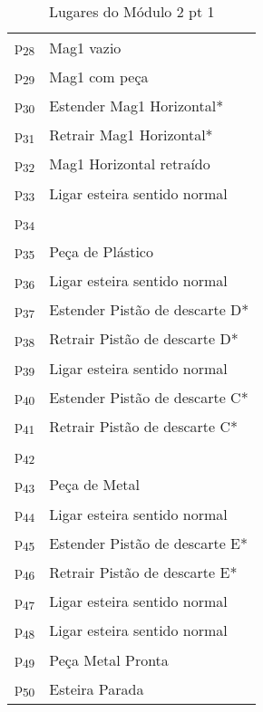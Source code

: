\begin{table}[htbp]
\caption{Lugares do Módulo 2 pt 1}
\centering
\begin{tabular}{ll}
p\textsubscript{28} & Mag1 vazio\\
p\textsubscript{29} & Mag1 com peça\\
p\textsubscript{30} & Estender Mag1 Horizontal*\\
p\textsubscript{31} & Retrair Mag1 Horizontal*\\
p\textsubscript{32} & Mag1 Horizontal retraído\\
p\textsubscript{33} & Ligar esteira sentido normal\\
p\textsubscript{34} & \\
p\textsubscript{35} & Peça de Plástico\\
p\textsubscript{36} & Ligar esteira sentido normal\\
p\textsubscript{37} & Estender Pistão de descarte D*\\
p\textsubscript{38} & Retrair Pistão de descarte D*\\
p\textsubscript{39} & Ligar esteira sentido normal\\
p\textsubscript{40} & Estender Pistão de descarte C*\\
p\textsubscript{41} & Retrair Pistão de descarte C*\\
p\textsubscript{42} & \\
p\textsubscript{43} & Peça de Metal\\
p\textsubscript{44} & Ligar esteira sentido normal\\
p\textsubscript{45} & Estender Pistão de descarte E*\\
p\textsubscript{46} & Retrair Pistão de descarte E*\\
p\textsubscript{47} & Ligar esteira sentido normal\\
p\textsubscript{48} & Ligar esteira sentido normal\\
p\textsubscript{49} & Peça Metal Pronta\\
p\textsubscript{50} & Esteira Parada\\
\end{tabular}
\end{table}


